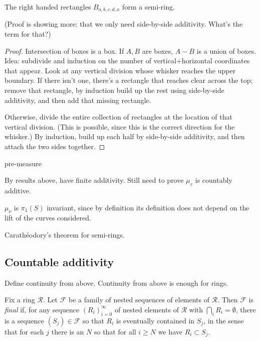 \begin{proposition}
The right handed rectangles $B_{a,b,c,d,x}$ form a semi-ring.
\end{proposition}

(Proof is showing more: that we only need side-by-side additivity.
What's the term for that?)

\begin{proof}
Intersection of boxes is a box.
If $A,B$ are boxes, $A - B$ is a union of boxes. Idea: subdivide and induction on the number of vertical+horizontal
coordinates that appear. Look at any vertical division whose whisker
reaches
the upper boundary. If there isn't one, there's a rectangle that
reaches clear across the top; remove that rectangle, by induction
build up the rest using side-by-side additivity, and then add that
missing rectangle.

Otherwise, divide the entire collection of rectangles at the location
of that vertical division. (This is possible, since this is the
correct direction for the whisker.) By induction, build up each half
by side-by-side additivity, and then attach the two sides together.
\end{proof}

\begin{definition}
pre-measure
\end{definition}

By results above, have finite additivity. Still need to prove $\mu_v$ is
countably additive.

\begin{remark}
$\mu_{\nu}$ is $\pi_1(S)$ invariant, since by definition its definition does not depend on the lift of the curves considered.
\end{remark}

\begin{theorem}
Carathéodory's theorem for semi-rings.
\end{theorem}

\subsection{Countable additivity}
\label{sec:countable-additivity}

Define continuity from above. Continuity from above is enough for
rings.

\begin{definition}
  Fix a ring $\mathcal{R}$. Let $\mathcal{F}$ be a family of nested sequences
  of elements of $\mathcal{R}$. Then $\mathcal{F}$ is \emph{final} if,
  for any sequence $(R_i)_{i=0}^{\infty}$ of nested elements of
  $\mathcal{R}$ with $\bigcap_i R_i = \emptyset$, there is a sequence
  $(S_j) \in \mathcal{F}$ so that $R_i$ is eventually contained in
  $S_j$, in the sense that for each $j$ there is an $N$ so that for
  all $i \ge N$ we have $R_i \subset S_j$.
\end{definition}

